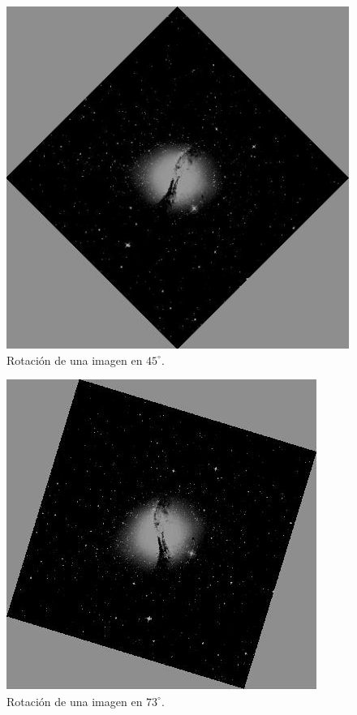 \begin{figure}[ht!]
	\centering
	\includegraphics[scale=.5]{img/rot45}
	\caption{Rotación de una imagen en $45^\circ$.}
	\label{img:rot45}
\end{figure}

\begin{figure}[ht!]
	\centering
	\includegraphics[scale=.5]{img/rot73}
	\caption{Rotación de una imagen en $73^\circ$.}
	\label{img:rot73}
\end{figure}

